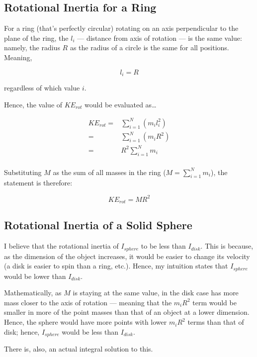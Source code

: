 \documentclass[letterpaper]{article}
\begin{document}
\subsection{Rotational Inertia for a Ring}
\label{sec:orgfcd1570}
For a ring (that's perfectly circular) rotating on an axis perpendicular to the plane of the ring, the \(l_i\) --- distance from axis of rotation --- is the same value: namely, the radius \(R\) as the radius of a circle is the same for all positions. Meaning,

\begin{equation}
    l_i = R
\end{equation}

regardless of which value \(i\).

Hence, the value of \(KE_{rot}\) would be evaluated as\ldots{}

\begin{align}
    KE_{rot} =& \sum^N_{i=1}(m_il^2_i) \\
    =& \sum^N_{i=1}(m_iR^2) \\
    =& R^2 \sum^N_{i=1}m_i \\
\end{align}

Substituting \(M\) as the sum of all masses in the ring (\(M=\sum^N_{i=1}m_i\)), the statement is therefore:

\begin{equation}
    KE_{rot} = MR^2
\end{equation}

\subsection{Rotational Inertia of a Solid Sphere}
\label{sec:org96654a8}
I believe that the rotational inertia of \(I_{sphere}\) to be less than \(I_{disk}\). This is because, as the dimension of the object increases, it would be easier to change its velocity (a disk is easier to spin than a ring, etc.). Hence, my intuition states that \(I_{sphere}\) would be lower than \(I_{disk}\).

Mathematically, as \(M\) is staying at the same value, in the disk case has more mass closer to the axis of rotation --- meaning that the \(m_iR^2\) term would be smaller in more of the point masses than that of an object at a lower dimension. Hence, the sphere would have more points with lower \(m_iR^2\) terms than that of disk; hence, \(I_{sphere}\) would be less than \(I_{disk}\).

There is, also, an actual integral solution to this.
\end{document}
